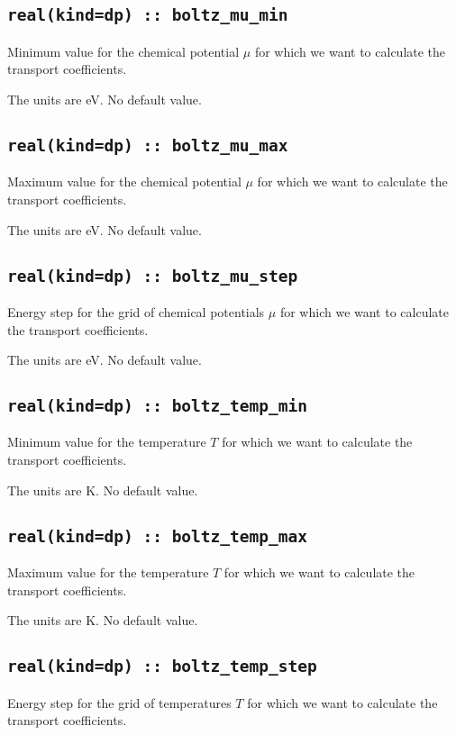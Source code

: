 \subsection[boltz\_mu\_min]{\tt real(kind=dp) :: boltz\_mu\_min}
Minimum value for the chemical potential $\mu$ for which we want to calculate the transport coefficients.

The units are eV.
No default value.

\subsection[boltz\_mu\_max]{\tt real(kind=dp) :: boltz\_mu\_max}
Maximum value for the chemical potential $\mu$ for which we want to calculate the transport coefficients.

The units are eV.
No default value.

\subsection[boltz\_mu\_step]{\tt real(kind=dp) :: boltz\_mu\_step}
Energy step for the grid of chemical potentials $\mu$ for which we want to calculate the transport coefficients.

The units are eV.
No default value.

\subsection[boltz\_temp\_min]{\tt real(kind=dp) :: boltz\_temp\_min}
Minimum value for the temperature $T$ for which we want to calculate the transport coefficients.

The units are K.
No default value.

\subsection[boltz\_temp\_max]{\tt real(kind=dp) :: boltz\_temp\_max}
Maximum value for the temperature $T$ for which we want to calculate the transport coefficients.

The units are K.
No default value.

\subsection[boltz\_temp\_step]{\tt real(kind=dp) :: boltz\_temp\_step}
Energy step for the grid of temperatures $T$ for which we want to calculate the transport coefficients.

